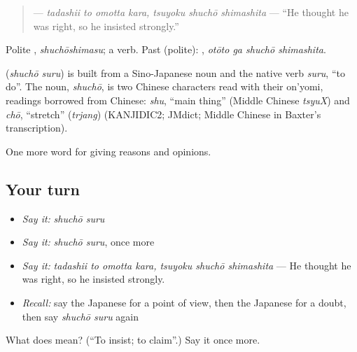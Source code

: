 \begin{quote}
\textbf{  } — \emph{tadashii to omotta kara, tsuyoku shuchō shimashita} — \textquotedblleft{}He thought he was right, so he insisted strongly.\textquotedblright{}
\end{quote}

Polite \textbf{}, \emph{shuchōshimasu}; a  verb. Past (polite): \textbf{ }, \emph{otōto ga shuchō shimashita}.

\begin{cousinweb}
\textbf{} (\emph{shuchō suru}) is built from a Sino-Japanese noun and the native verb \emph{suru}, \textquotedblleft{}to do\textquotedblright{}. The noun, \emph{shuchō}, is two Chinese characters read with their on'yomi, readings borrowed from Chinese: \emph{shu}, \textquotedblleft{}main thing\textquotedblright{} (Middle Chinese \emph{tsyuX}) and \emph{chō}, \textquotedblleft{}stretch\textquotedblright{} (\emph{trjang}) (KANJIDIC2; JMdict; Middle Chinese in Baxter's transcription).
\end{cousinweb}

\begin{grammarlens}[title={What you've built}]
One more word for giving reasons and opinions.
\end{grammarlens}

\subsection*{Your turn}
\begin{itemize}
\raggedright
  \item \emph{Say it:} \emph{shuchō suru}
  \item \emph{Say it:} \emph{shuchō suru}, once more
  \item \emph{Say it:} \emph{tadashii to omotta kara, tsuyoku shuchō shimashita} — He thought he was right, so he insisted strongly.
  \item \emph{Recall:} say the Japanese for a point of view, then the Japanese for a doubt, then say \emph{shuchō suru} again
\end{itemize}

\begin{tcolorbox}[breakable,colback=teal!4,colframe=teal!35!black,title={Before you move on}]
What does  mean? (\textquotedblleft{}To insist; to claim\textquotedblright{}.) Say it once more.
\end{tcolorbox}
